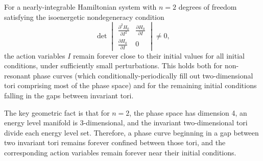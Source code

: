 For a nearly-integrable Hamiltonian system with $n = 2$ degrees of freedom satisfying the isoenergetic nondegeneracy condition
$$\det \begin{vmatrix}
\frac{\partial^2 H_0}{\partial I^2} & \frac{\partial H_0}{\partial I} \\[4pt]
\frac{\partial H_0}{\partial I} & 0
\end{vmatrix} \neq 0,$$
the action variables $I$ remain forever close to their initial values for all initial conditions, under sufficiently small perturbations. This holds both for non-resonant phase curves (which conditionally-periodically fill out two-dimensional tori comprising most of the phase space) and for the remaining initial conditions falling in the gaps between invariant tori.

The key geometric fact is that for $n = 2$, the phase space has dimension 4, an energy level manifold is 3-dimensional, and the invariant two-dimensional tori divide each energy level set. Therefore, a phase curve beginning in a gap between two invariant tori remains forever confined between those tori, and the corresponding action variables remain forever near their initial conditions.
